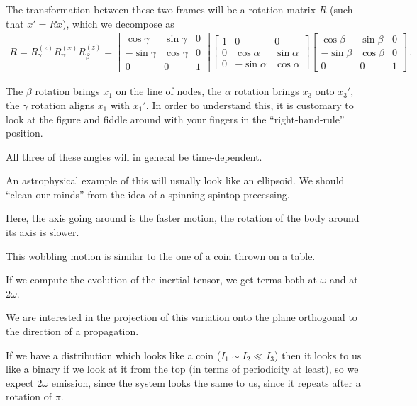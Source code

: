 \documentclass[main.tex]{subfiles}
\begin{document}
The transformation between these two frames will be a rotation matrix \(R\) (such that \(x' = R x\)), which we decompose as 
%
\begin{align}
R = R_{\gamma }^{(z)} R_{\alpha }^{(x)} R_{\beta }^{(z)} 
= \left[\begin{array}{ccc}
\cos \gamma  & \sin \gamma  & 0 \\ 
- \sin \gamma  & \cos \gamma  & 0 \\ 
0 & 0 & 1
\end{array}\right]
\left[\begin{array}{ccc}
1 & 0 & 0 \\ 
0 & \cos \alpha  & \sin \alpha  \\ 
0 & -\sin \alpha  & \cos \alpha 
\end{array}\right]
\left[\begin{array}{ccc}
\cos \beta  & \sin \beta  & 0 \\ 
- \sin \beta  & \cos \beta  & 0 \\ 
0 & 0 & 1
\end{array}\right]
\,.
\end{align}

The \(\beta \) rotation brings \(x_1 \) on the line of nodes, the \(\alpha \) rotation brings \(x_3 \) onto \(x_3'\), the \(\gamma \) rotation aligns \(x_1 \) with \(x_1'\). 
In order to understand this, it is customary to look at the figure \cite[fig.\ 4.15]{maggioreGravitationalWavesVolume2007} and fiddle around with your fingers in the ``right-hand-rule'' position. 

All three of these angles will in general be time-dependent. 

An astrophysical example of this will usually look like an ellipsoid.
We should ``clean our minds'' from the idea of a spinning spintop precessing.

Here, the axis going around is the faster motion, the rotation of the body around its axis is slower. 

This wobbling motion is similar to the one of a coin thrown on a table.

If we compute the evolution of the inertial tensor, we get terms both at \(\omega \) and at \(2 \omega \). 

We are interested in the projection of this variation onto the plane orthogonal to the direction of a propagation. 

If we have a distribution which looks like a coin (\(I_1 \sim I_2 \ll I_3 \)) then it looks to us like a binary if we look at it from the top (in terms of periodicity at least), so we expect \(2 \omega \) emission, since the system looks the same to us, since it repeats after a rotation of \(\pi \). 
\end{document}

